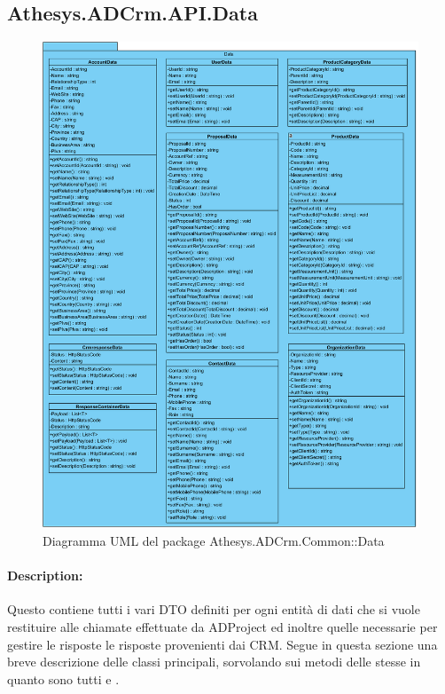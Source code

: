 \subsection{Athesys.ADCrm.API.Data}
\begin{figure}[H]
	\centering
	\includegraphics[width=\linewidth]{images/modules/Data}
	\caption{Diagramma UML del package Athesys.ADCrm.Common::Data}
	\label{fig:data}
\end{figure}

\paragraph{Description:}
Questo  contiene tutti i vari \gls{DTO} definiti per ogni entità di dati che si vuole restituire alle chiamate effettuate da ADProject ed inoltre quelle necessarie per gestire le risposte le risposte provenienti dai CRM. 
Segue in questa sezione una breve descrizione delle classi principali, sorvolando sui metodi delle stesse in quanto sono tutti   e .


